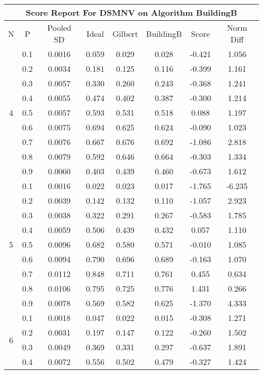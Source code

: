 \documentclass[11pt,a4paper]{report}
\begin{document}
\begin{longtable}{ | c | c || c | c | c | c | c | c | }
\hline
\multicolumn{8}{|c|}{ Score Report For DSMNV on Algorithm BuildingB} \\
\hline
N & P & Pooled SD &  Ideal &  Gilbert & BuildingB  & Score & Norm Diff \\
 \hline
 \hline
 \endhead
\multirow{9}{*}{4} & 0.1 & 0.0016 & 0.059 & 0.029 & 0.028 & -0.421 & 1.056 \\
 & 0.2 & 0.0034 & 0.181 & 0.125 & 0.116 & -0.399 & 1.161 \\
 & 0.3 & 0.0057 & 0.330 & 0.260 & 0.243 & -0.368 & 1.241 \\
 & 0.4 & 0.0055 & 0.474 & 0.402 & 0.387 & -0.300 & 1.214 \\
 & 0.5 & 0.0057 & 0.593 & 0.531 & 0.518 & 0.088 & 1.197 \\
 & 0.6 & 0.0075 & 0.694 & 0.625 & 0.624 & -0.090 & 1.023 \\
 & 0.7 & 0.0076 & 0.667 & 0.676 & 0.692 & -1.086 & 2.818 \\
 & 0.8 & 0.0079 & 0.592 & 0.646 & 0.664 & -0.303 & 1.334 \\
 & 0.9 & 0.0060 & 0.403 & 0.439 & 0.460 & -0.673 & 1.612 \\
 \hline
\multirow{9}{*}{5} & 0.1 & 0.0016 & 0.022 & 0.023 & 0.017 & -1.765 & -6.235 \\
 & 0.2 & 0.0039 & 0.142 & 0.132 & 0.110 & -1.057 & 2.923 \\
 & 0.3 & 0.0038 & 0.322 & 0.291 & 0.267 & -0.583 & 1.785 \\
 & 0.4 & 0.0059 & 0.506 & 0.439 & 0.432 & 0.057 & 1.110 \\
 & 0.5 & 0.0096 & 0.682 & 0.580 & 0.571 & -0.010 & 1.085 \\
 & 0.6 & 0.0094 & 0.790 & 0.696 & 0.689 & -0.163 & 1.070 \\
 & 0.7 & 0.0112 & 0.848 & 0.711 & 0.761 & 0.455 & 0.634 \\
 & 0.8 & 0.0106 & 0.795 & 0.725 & 0.776 & 1.431 & 0.266 \\
 & 0.9 & 0.0078 & 0.569 & 0.582 & 0.625 & -1.370 & 4.333 \\
 \hline
\multirow{9}{*}{6} & 0.1 & 0.0018 & 0.047 & 0.022 & 0.015 & -0.308 & 1.271 \\
 & 0.2 & 0.0031 & 0.197 & 0.147 & 0.122 & -0.260 & 1.502 \\
 & 0.3 & 0.0049 & 0.369 & 0.331 & 0.297 & -0.637 & 1.891 \\
 & 0.4 & 0.0072 & 0.556 & 0.502 & 0.479 & -0.327 & 1.424 \\

\end{longtable}
\end{document}
